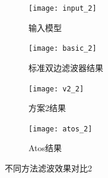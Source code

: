 \documentclass{article}
\theoremstyle{definition}
\theoremstyle{remark}
\begin{document}
\begin{figure}[H]
  	\begin{subfigure}[b]{0.5\textwidth}
        \texttt{[image: input\_2]}
        \caption[input]{输入模型}
        \end{subfigure}
        \begin{subfigure}[b]{0.5\textwidth}
        \texttt{[image: basic\_2]}
        \caption[basic]{标准双边滤波器结果}
        \end{subfigure}
        \begin{subfigure}[b]{0.5\textwidth}
        \texttt{[image: v2\_2]}
        \caption[our]{方案2结果}
        \end{subfigure}
        \begin{subfigure}[b]{0.5\textwidth}
	\texttt{[image: atos\_2]}
        \caption[atos]{Atos结果}
        \end{subfigure}
        \caption[不同方法滤波效果对比]
	{不同方法滤波效果对比2}
\end{figure}
\end{document}
